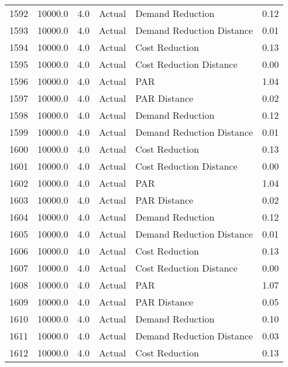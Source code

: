 \begin{longtable}{lrrllr}
1592 &      10000.0 &     4.0 &         Actual &           Demand Reduction &   0.12 \\
1593 &      10000.0 &     4.0 &         Actual &  Demand Reduction Distance &   0.01 \\
1594 &      10000.0 &     4.0 &         Actual &             Cost Reduction &   0.13 \\
1595 &      10000.0 &     4.0 &         Actual &    Cost Reduction Distance &   0.00 \\
1596 &      10000.0 &     4.0 &         Actual &                        PAR &   1.04 \\
1597 &      10000.0 &     4.0 &         Actual &               PAR Distance &   0.02 \\
1598 &      10000.0 &     4.0 &         Actual &           Demand Reduction &   0.12 \\
1599 &      10000.0 &     4.0 &         Actual &  Demand Reduction Distance &   0.01 \\
1600 &      10000.0 &     4.0 &         Actual &             Cost Reduction &   0.13 \\
1601 &      10000.0 &     4.0 &         Actual &    Cost Reduction Distance &   0.00 \\
1602 &      10000.0 &     4.0 &         Actual &                        PAR &   1.04 \\
1603 &      10000.0 &     4.0 &         Actual &               PAR Distance &   0.02 \\
1604 &      10000.0 &     4.0 &         Actual &           Demand Reduction &   0.12 \\
1605 &      10000.0 &     4.0 &         Actual &  Demand Reduction Distance &   0.01 \\
1606 &      10000.0 &     4.0 &         Actual &             Cost Reduction &   0.13 \\
1607 &      10000.0 &     4.0 &         Actual &    Cost Reduction Distance &   0.00 \\
1608 &      10000.0 &     4.0 &         Actual &                        PAR &   1.07 \\
1609 &      10000.0 &     4.0 &         Actual &               PAR Distance &   0.05 \\
1610 &      10000.0 &     4.0 &         Actual &           Demand Reduction &   0.10 \\
1611 &      10000.0 &     4.0 &         Actual &  Demand Reduction Distance &   0.03 \\
1612 &      10000.0 &     4.0 &         Actual &             Cost Reduction &   0.13 \\

\end{longtable}
